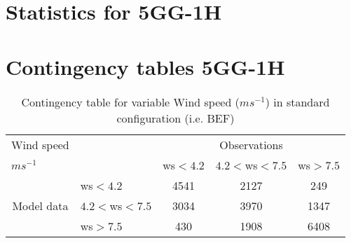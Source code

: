 \documentclass[11pt,english]{article}
\begin{document}
\section{Statistics for 5GG-1H}
\clearpage
\section{Contingency tables 5GG-1H}

\begin{table}[]
\begin{center}
\begin{tabular}{llccc}
\hline
{Wind speed}                                       &                                                    & \multicolumn{3}{c}{Observations}                 \\
{$m s^{-1}$}                                       &                             & ws$<4.2$   & $4.2<$ws$<7.5$ & ws$>7.5$ \\
\hline
\multicolumn{1}{c}{\multirow{3}{*}{Model data}}  & ws$<4.2$          & 4541                & 2127                       & 249              \\
                                                 & $4.2<$ws$<7.5$ & 3034                & 3970                       & 1347              \\
                                                 & ws$>7.5$          & 430                & 1908                       & 6408              \\
\hline
\end{tabular}
\end{center}
\caption{Contingency table for variable Wind speed ($m s^{-1}$) in standard configuration (i.e. BEF)}
\label{tab:contingency}
\end{table}
\end{document}
